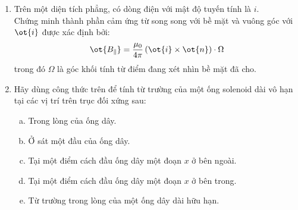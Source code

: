 \begin{vd}%
\begin{enumerate}[1)]
    \item Trên một diện tích phẳng, có dòng điện với mật độ tuyến tính là $i$.\\
Chứng minh thành phần cảm ứng từ song song với bề mặt và vuông góc với $\ot{i}$ được xác định bởi:
$$\ot{B_\parallel}=\dfrac{\mu_0}{4\pi}\left(\ot{i}\times\ot{n}\right)\cdot\Omega$$
trong đó $\Omega$ là góc khối tính từ điểm đang xét nhìn bề mặt đã cho.
    \item Hãy dùng công thức trên để tính từ trường của một ống solenoid dài vô hạn tại các vị trí trên trục đối xứng sau:
    \begin{enumerate}[a)]
        \item Trong lòng của ống dây.
        \item Ở sát một đầu của ống dây.
        \item Tại một điểm cách đầu ống dây một đoạn $x$ ở bên ngoài.
        \item Tại một điểm cách đầu ống dây một đoạn $x$ ở bên trong.
        \item Từ trường trong lòng của một ống dây dài hữu hạn.
    \end{enumerate}
\end{enumerate}
\end{vd}
